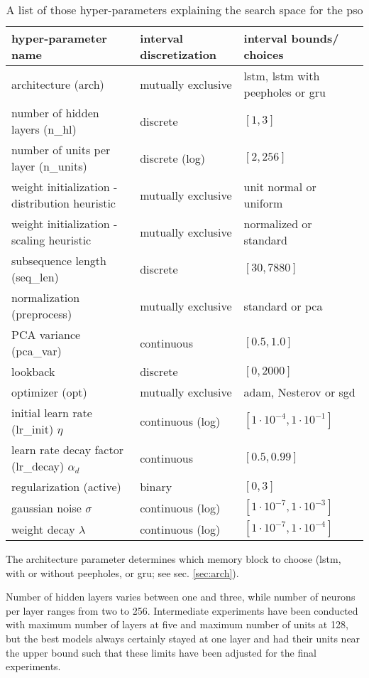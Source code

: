 \begin{table}
	\caption{A list of those hyper-parameters explaining the search space for the \gls{pso}}
	\label{tab:hyperparams}
	\centering
	\begin{tabular}{C{4.5cm} C{4cm} C{5cm}}
		\toprule
		hyper-parameter name & interval discretization & interval bounds/ choices\\
		\midrule
		architecture (arch)& mutually exclusive & \gls{lstm}, \gls{lstm} with peepholes or \gls{gru}\\
		number of hidden layers (n\_hl)& discrete & $[1, 3]$\\
		number of units per layer (n\_units)& discrete (log) & $[2, 256]$\\
		weight initialization - \quad distribution heuristic  & mutually exclusive & unit normal or uniform\\
		weight initialization - scaling heuristic & mutually exclusive & normalized or standard\\
		subsequence length (seq\_len)& discrete & $[30, 7880]$\\
		normalization (preprocess)& mutually exclusive & standard or \gls{pca}\\
		PCA variance (pca\_var)& continuous & $[0.5, 1.0]$\\
		lookback & discrete & $[0, 2000]$\\
		optimizer (opt)& mutually exclusive & \gls{adam}, Nesterov or \gls{sgd}\\
		initial learn rate (lr\_init) $\eta$& continuous (log) & $[1\cdot 10^{-4}, 1\cdot 10^{-1}]$\\
		learn rate decay factor (lr\_decay) $\alpha_d$ & continuous & $[0.5, 0.99]$\\
		regularization (active)& binary & $[0, 3]$\\
		gaussian noise $\sigma$ & continuous (log) & $[1\cdot 10^{-7}, 1\cdot 10^{-3}]$\\
		weight decay $\lambda$& continuous (log) & $[1\cdot 10^{-7}, 1\cdot 10^{-4}]$\\
		\bottomrule
	 \end{tabular}
\end{table}
The architecture parameter determines which memory block to choose (\gls{lstm}, with or without peepholes, or \gls{gru}; see sec. \ref{sec:arch}).

Number of hidden layers varies between one and three, while number of neurons per layer ranges from two to 256.
Intermediate experiments have been conducted with maximum number of layers at five and maximum number of units at 128, but the best models always certainly stayed at one layer and had their units near the upper bound such that these limits have been adjusted for the final experiments.
 
